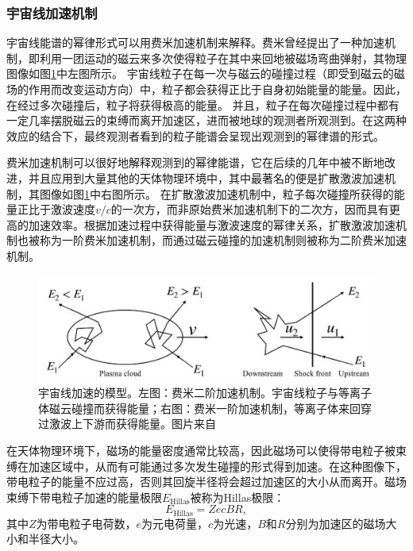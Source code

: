 \subsubsection{宇宙线加速机制}

宇宙线能谱的幂律形式可以用费米加速机制来解释。费米曾经提出了一种加速机制，即利用一团运动的磁云来多次使得粒子在其中来回地被磁场弯曲弹射\cite{Fermi_acceleration:1949}，其物理图像如图\ref{fig:CR_acceration}中左图所示。
宇宙线粒子在每一次与磁云的碰撞过程（即受到磁云的磁场的作用而改变运动方向）中，粒子都会获得正比于自身初始能量的能量。因此，在经过多次碰撞后，粒子将获得极高的能量。
并且，粒子在每次碰撞过程中都有一定几率摆脱磁云的束缚而离开加速区，进而被地球的观测者所观测到。在这两种效应的结合下，最终观测者看到的粒子能谱会呈现出观测到的幂律谱的形式。

费米加速机制可以很好地解释观测到的幂律能谱，它在后续的几年中被不断地改进，并且应用到大量其他的天体物理环境中，其中最著名的便是扩散激波加速机制\cite{Bell_shock_1:1978, Bell_shock_2:1978}，其图像如图\ref{fig:CR_acceration}中右图所示。
在扩散激波加速机制中，粒子每次碰撞所获得的能量正比于激波速度$v/c$的一次方，而非原始费米加速机制下的二次方，因而具有更高的加速效率。根据加速过程中获得能量与激波速度的幂律关系，扩散激波加速机制也被称为一阶费米加速机制，而通过磁云碰撞的加速机制则被称为二阶费米加速机制。

\begin{figure}[htb]
    \centering
    \includegraphics[width=0.8\linewidth]{img/Fermi_acceleration.png}
    \caption{宇宙线加速的模型。左图：费米二阶加速机制。宇宙线粒子与等离子体磁云碰撞而获得能量；右图：费米一阶加速机制，等离子体来回穿过激波上下游而获得能量。图片来自\parencite{Gaisser:2016}}
    \label{fig:CR_acceration}
\end{figure}

在天体物理环境下，磁场的能量密度通常比较高，因此磁场可以使得带电粒子被束缚在加速区域中，从而有可能通过多次发生碰撞的形式得到加速。在这种图像下，带电粒子的能量不应过高，否则其回旋半径将会超过加速区的大小从而离开。磁场束缚下带电粒子加速的能量极限$E_\mathrm{Hillas}$被称为Hillas极限\cite{Hillas_limit:1984}：
\begin{equation}
    E_\mathrm{Hillas} = Z e c B R ,
\end{equation}
其中$Z$为带电粒子电荷数，$e$为元电荷量，$c$为光速，$B$和$R$分别为加速区的磁场大小和半径大小。

